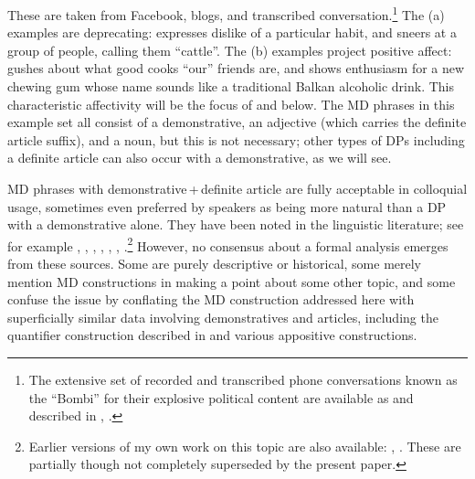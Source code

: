 \documentclass[output=paper]{langscibook}
\begin{document}
\noindent These are taken from Facebook, blogs, and transcribed conversation.\footnote{The extensive set of recorded and transcribed  phone conversations known as the ``Bombi'' for their explosive political content are available as \citet{Prizma2015} and described in \citet{Friedman2016}, \citet{Friedman2019}.} The (a) examples are deprecating:  expresses dislike of a particular habit, and  sneers at a group of people, calling them ``cattle''. The (b) examples project positive affect:  gushes about what good cooks ``our'' friends are, and  shows enthusiasm for a new chewing gum whose name sounds like a traditional Balkan alcoholic drink. This characteristic affectivity will be the focus of  and  below. The MD phrases in this example set all consist of a demonstrative, an adjective (which carries the definite article suffix), and a noun, but this is not necessary; other types of DPs including a definite article can also occur with a demonstrative, as we will see.

MD phrases with demonstrative\,+\,definite article are fully acceptable in colloquial usage, sometimes even preferred by speakers as being more natural than a DP with a demonstrative alone. They have been noted in the linguistic literature; see for example \citet{Ugrinova-Skalovska1960/61}, \citet{Arnaudova1998}, \citet{Tasseva-Kurktchieva2006}, \citet{Hauge1999}, \citet{Mladenova2007}, \citet{Dimitrova-Vulchanova.Tomic2009},  \citet{Friedman2019}.\footnote{Earlier versions of my own work on this topic are also available: \citet{Rudin2018}, \citet{RudinToAppear}. These are partially though not completely superseded by the present paper.} However, no consensus about a formal analysis emerges from these sources. Some are purely descriptive or historical, some merely mention MD constructions in making a point about some other topic, and
some confuse the issue by conflating the MD construction addressed here with superficially similar data involving demonstratives and articles, including the quantifier construction described in  and various appositive constructions.
\end{document}

